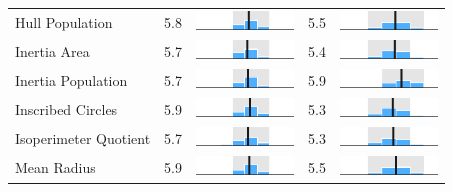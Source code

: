 \begin{table}
\begin{tabular}{l rm{7em} rm{7em}}
Hull Population        &   5.8 &       \includegraphics[width=7em]{mini_hist/NC_2012_hull_p} &   5.5 &       \includegraphics[width=7em]{mini_hist/NC_2016_hull_p} \\
Inertia Area           &   5.7 &    \includegraphics[width=7em]{mini_hist/NC_2012_inertia_a} &   5.4 &    \includegraphics[width=7em]{mini_hist/NC_2016_inertia_a} \\
Inertia Population     &   5.7 &    \includegraphics[width=7em]{mini_hist/NC_2012_inertia_p} &   5.9 &    \includegraphics[width=7em]{mini_hist/NC_2016_inertia_p} \\
Inscribed Circles      &   5.9 &    \includegraphics[width=7em]{mini_hist/NC_2012_ehrenburg} &   5.3 &    \includegraphics[width=7em]{mini_hist/NC_2016_ehrenburg} \\
Isoperimeter Quotient  &   5.7 &       \includegraphics[width=7em]{mini_hist/NC_2012_polsby} &   5.3 &       \includegraphics[width=7em]{mini_hist/NC_2016_polsby} \\
Mean Radius            &   5.9 &  \includegraphics[width=7em]{mini_hist/NC_2012_mean_radius} &   5.5 &  \includegraphics[width=7em]{mini_hist/NC_2016_mean_radius} \\

\end{tabular}
\end{table}
